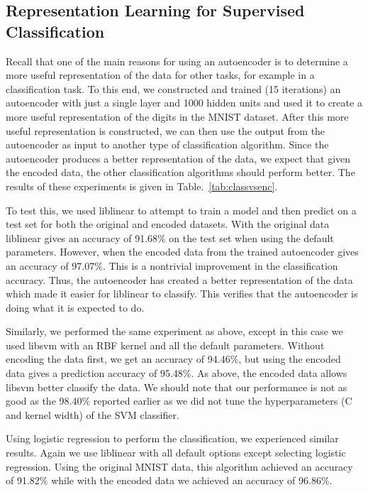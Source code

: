 \subsection{Representation Learning for Supervised Classification}

Recall that one of the main reasons for using an autoencoder is to determine a
more useful representation of the data for other tasks, for example in a
classification task. To this end, we constructed and trained (15 iterations) an
autoencoder with just a single layer and 1000 hidden units and used it to
create a more useful representation of the digits in the MNIST dataset. After
this more useful representation is constructed, we can then use the output from
the autoencoder as input to another type of classification algorithm.  Since
the autoencoder produces a better representation of the data, we expect that
given the encoded data, the other classification algorithms should perform
better.  The results of these experiments is given in
Table.~\ref{tab:classvsenc}.

To test this, we used liblinear \cite{fan2008liblinear} to attempt to train a model and then predict on
a test set for both the original and encoded datasets. With the original data
liblinear gives an accuracy of 91.68\% on the test set when using the default
parameters. However, when the encoded data from the trained autoencoder gives
an accuracy of 97.07\%. This is a nontrivial improvement in the classification
accuracy. Thus, the autoencoder has created a better representation of the data
which made it easier for liblinear to classify. This verifies that the
autoencoder is doing what it is expected to do.

Similarly, we performed the same experiment as above, except in this case we
used libsvm with an RBF kernel and all the default parameters.  Without
encoding the data first, we get an accuracy of 94.46\%, but using the encoded
data gives a prediction accuracy of 95.48\%. As above, the encoded data allows libsvm
better classify the data. We should note that our performance is not as good as the 98.40\% reported earlier as we did not tune the hyperparameters (C and kernel width) of the SVM classifier. 

Using logistic regression to perform the classification, we experienced similar results.
Again we use liblinear with all default options except selecting logistic regression. Using the
original MNIST data, this algorithm achieved an accuracy of 91.82\% while with the encoded data
we achieved an accuracy of 96.86\%.

